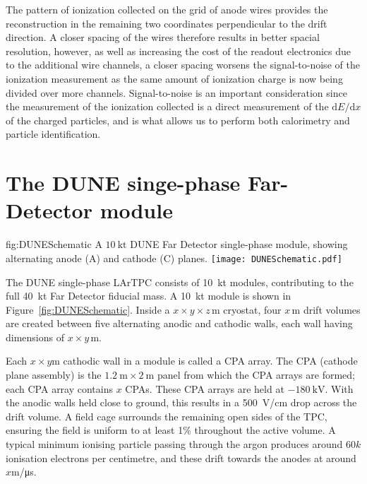 The pattern of ionization collected on the grid of anode wires provides the reconstruction in the remaining two coordinates perpendicular to the drift direction. A closer spacing of the wires therefore results in better spacial resolution, however, as well as increasing the cost of the readout electronics due to the additional wire channels, a closer spacing worsens the signal-to-noise of the ionization measurement as the same amount of ionization charge is now being divided over more channels. Signal-to-noise is an important consideration since the measurement of the ionization collected is a direct measurement of the $\mathrm{d}E/\mathrm{d}x$ of the charged particles, and is what allows us to perform both calorimetry and particle identification.

\section{The DUNE singe-phase Far-Detector module}
\label{sec:fdsp-exec-dunefd}

\begin{dunefigure}{fig:DUNESchematic}
{A $\SI{10}{\kilo\tonne}$ DUNE Far Detector single-phase module, showing alternating anode (A) and cathode (C) planes.}
\texttt{[image: DUNESchematic.pdf]}
\end{dunefigure}

The DUNE single-phase LArTPC consists of \SI{10}{\kilo\tonne} modules, contributing to the full \SI{40}{\kilo\tonne} Far Detector fiducial mass. A \SI{10}{\kilo\tonne} module is shown in Figure~\ref{fig:DUNESchematic}. Inside a $x\times y \times z\,\si{\meter}$ cryostat, four $x\,\si{\meter}$ drift volumes are created between five alternating anodic and cathodic walls, each wall having dimensions of $x\times y\,\si{\meter}$.

Each $x\times y$\si{\meter} cathodic wall in a module is called a CPA array. The CPA (cathode plane assembly) is the $\SI{1.2}{\meter}\times\SI{2}{\meter}$ panel from which the CPA arrays are formed; each CPA array contains $x$ CPAs. These CPA arrays are held at $-\SI{180}{\kilo\volt}$. With the anodic walls held close to ground, this results in a \SI{500}{\volt/\centi\meter} drop across the drift volume. A field cage surrounds the remaining open sides of the TPC, ensuring the field is uniform to at least 1\% throughout the active volume. A typical minimum ionising particle passing through the argon produces around $60k$ ionisation electrons per centimetre, and these drift towards the anodes at around $x$\si{\meter/\micro\second}.

